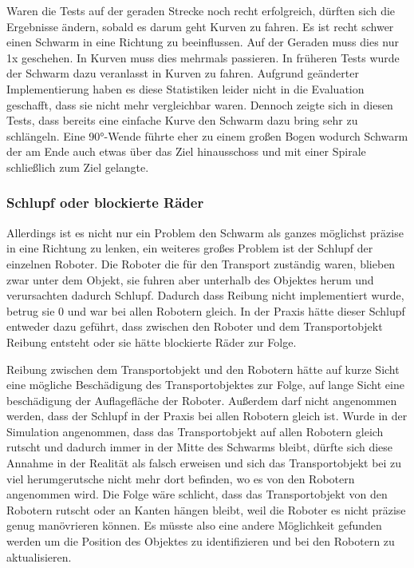 Waren die Tests auf der geraden Strecke noch recht erfolgreich, dürften sich die Ergebnisse ändern, sobald es darum geht Kurven zu fahren. Es ist recht schwer einen Schwarm in eine Richtung zu beeinflussen. Auf der Geraden muss dies nur 1x geschehen. In Kurven muss dies mehrmals passieren. In früheren Tests wurde der Schwarm dazu veranlasst in Kurven zu fahren. Aufgrund geänderter Implementierung haben es diese Statistiken leider nicht in die Evaluation geschafft, dass sie nicht mehr vergleichbar waren. Dennoch zeigte sich in diesen Tests, dass bereits eine einfache Kurve den Schwarm dazu bring sehr zu schlängeln. Eine 90°-Wende führte eher zu einem großen Bogen wodurch Schwarm der am Ende auch etwas über das Ziel hinausschoss und mit einer Spirale schließlich zum Ziel gelangte.

\subsubsection*{Schlupf oder blockierte Räder}
Allerdings ist es nicht nur ein Problem den Schwarm als ganzes möglichst präzise in eine Richtung zu lenken, ein weiteres großes Problem ist der Schlupf der einzelnen Roboter.
Die Roboter die für den Transport zuständig waren, blieben zwar unter dem Objekt, sie fuhren aber unterhalb des Objektes herum und verursachten dadurch Schlupf. Dadurch dass Reibung nicht implementiert wurde, betrug sie 0 und war bei allen Robotern gleich. In der Praxis hätte dieser Schlupf entweder dazu geführt, dass zwischen den Roboter und dem Transportobjekt Reibung entsteht oder sie hätte blockierte Räder zur Folge.

Reibung zwischen dem Transportobjekt und den Robotern hätte auf kurze Sicht eine mögliche Beschädigung des Transportobjektes zur Folge, auf lange Sicht eine beschädigung der Auflagefläche der Roboter. Außerdem darf nicht angenommen werden, dass der Schlupf in der Praxis bei allen Robotern gleich ist. Wurde in der Simulation angenommen, dass das Transportobjekt auf allen Robotern gleich rutscht und dadurch immer in der Mitte des Schwarms bleibt, dürfte sich diese Annahme in der Realität als falsch erweisen und sich das Transportobjekt bei zu viel herumgerutsche nicht mehr dort befinden, wo es von den Robotern angenommen wird. Die Folge wäre schlicht, dass das Transportobjekt von den Robotern rutscht oder an Kanten hängen bleibt, weil die Roboter es nicht präzise genug manövrieren können. Es müsste also eine andere Möglichkeit gefunden werden um die Position des Objektes zu identifizieren und bei den Robotern zu aktualisieren.

